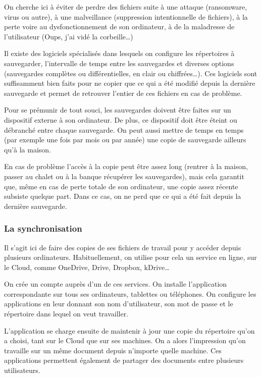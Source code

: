 \documentclass[10pt,a4paper]{report}
\begin{document}
On cherche ici à éviter de perdre des fichiers suite à une attaque (ransomware, virus ou autre), à une malveillance (suppression intentionnelle de fichiers), à la perte voire au dysfonctionnement de son ordinateur, à de la maladresse de l'utilisateur (Oups, j'ai vidé la corbeille\dots)

Il existe des logiciels spécialisés dans lesquels on configure les répertoires à sauvegarder, l'intervalle de temps entre les sauvegardes et diverses options (sauvegardes complètes ou différentielles, en clair ou chiffrées\dots). Ces logiciels sont suffisamment bien faits pour ne copier que ce qui a été modifié depuis la dernière sauvegarde et permet de retrouver l'entier de ces fichiers en cas de problème.

Pour se prémunir de tout souci, les sauvegardes doivent être faites sur un dispositif externe à son ordinateur. De plus, ce dispositif doit être éteint ou débranché entre chaque sauvegarde. On peut aussi mettre de temps en temps (par exemple une fois par mois ou par année) une copie de sauvegarde ailleurs qu'à la maison.

En cas de problème l'accès à la copie peut être assez long (rentrer à la maison, passer au chalet ou à la banque récupérer les sauvegardes), mais cela garantit que, même en cas de perte totale de son ordinateur, une copie assez récente subsiste quelque part. Dans ce cas, on ne perd que ce qui a été fait depuis la dernière sauvegarde.


\subsubsection{La synchronisation}

Il s'agit ici de faire des copies de ses fichiers de travail pour y accéder depuis plusieurs ordinateurs. Habituellement, on utilise pour cela un service en ligne, sur le Cloud, comme OneDrive, Drive, Dropbox, kDrive\dots

On crée un compte auprès d'un de ces services. On installe l'application correspondante sur tous ses ordinateurs, tablettes ou téléphones. On configure les applications en leur donnant son nom d'utilisateur, son mot de passe et le répertoire dans lequel on veut travailler.

L'application se charge ensuite de maintenir à jour une copie du répertoire qu'on a choisi, tant sur le Cloud que sur ses machines. On a alors l'impression qu'on travaille sur un même document depuis n'importe quelle machine. Ces applications permettent également de partager des documents entre plusieurs utilisateurs.
\end{document}
